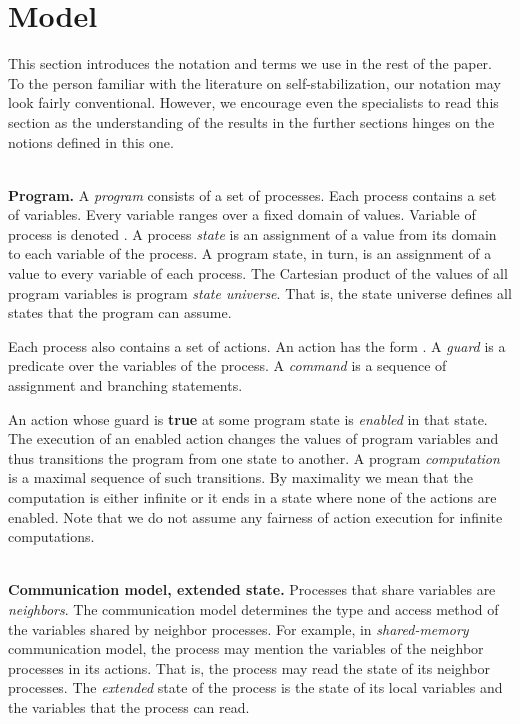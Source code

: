 \documentclass[11pt]{llncs}
\begin{document}
\section{Model}\label{SecModel}

This section introduces the notation and terms we use in the
rest of the paper. To the person familiar with the literature on
self-stabilization, our notation may look fairly
conventional. However, we encourage even the specialists to read
this section as the understanding of the results in the
further sections hinges on the notions defined in this one.

\ \\ \textbf{Program.} A \emph{program} consists of a set of 
processes. Each process contains a set of variables.  Every variable
ranges over a fixed domain of values. Variable  of process  is
denoted . A process \emph{state} is an assignment of a value from
its domain to each variable of the process. A program state, in turn,
is an assignment of a value to every variable of each process. The
Cartesian product of the values of all program variables is program
\emph{state universe}. That is, the state universe defines all states
that the program can assume.

Each process also contains a set of actions. An action has the form
. A \emph{guard} is a predicate over the variables of
the process. A \emph{command} is a sequence of assignment and
branching statements.


An action whose guard is \textbf{true} at some program state is
\emph{enabled} in that state. The execution of an enabled action
changes the values of program variables and thus transitions the
program from one state to another. A program \emph{computation} is a
maximal sequence of such transitions. By maximality we mean that the
computation is either infinite or it ends in a state where none of the
actions are enabled. Note that we do not assume any fairness of action
execution for infinite computations.

\ \\ \textbf{Communication model, extended state.} Processes that
share variables are \emph{neighbors}.  The communication model
determines the type and access method of the variables shared by
neighbor processes. For example, in \emph{shared-memory} communication
model, the process may mention the variables of the neighbor processes
in its actions. That is, the process may read the state of its
neighbor processes. The \emph{extended} state of the process is the
state of its local variables and the variables that the process can
read.
\end{document}
